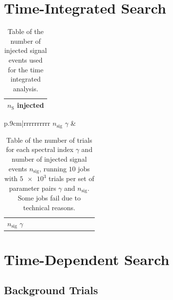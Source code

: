 \section{Time-Integrated Search}

\begin{table}
  \centering
  \caption{Table of the number of injected signal events used for the time integrated analysis.}
  \label{tab:sig_time_int_table}
  \begin{tabular}{r}
    \toprule
    $n_\text{S}$ injected \\
    \toprule
      
    \toprule
  \end{tabular}
\end{table}

\begin{table}
  \caption{Table of the number of trials for each spectral index $\gamma$ and number of injected signal events $n_\text{sig}$, running $\num{10}$ jobs with $\num{5e3}$ trials per set of parameter pairs $\gamma$ and $n_\text{sig}$. Some jobs fail due to technical reasons.}
  \label{tab:trials_sig_time_int_table}
  \begin{subtable}{\linewidth}
  \centering
  \begin{tabular}{p{.9cm}|rrrrrrrrrr}
    \toprule
    \: $n_\text{sig}$ \newline $\gamma$ \: & 
    \toprule
    
    \toprule
  \end{tabular}
\end{subtable}
\begin{subtable}{\linewidth}
\centering
  \begin{tabular}{p{.9cm}|rrrrrrrrrr}
    \toprule
    \: $n_\text{sig}$ \newline $\gamma$ \: & 
    \toprule
    
    \toprule
  \end{tabular}
  \end{subtable}
\end{table}

\section{Time-Dependent Search} \label{sec:time_dep_search_appendix}

\subsection{Background Trials}

